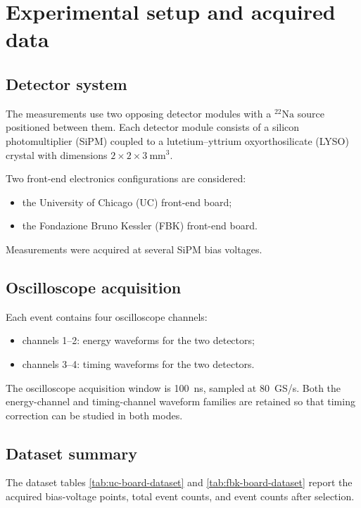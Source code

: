\section{Experimental setup and acquired data}

\subsection{Detector system}

The measurements use two opposing detector modules with a \(^{22}\mathrm{Na}\) source positioned between them. 
Each detector module consists of a silicon photomultiplier (SiPM) coupled to a lutetium--yttrium oxyorthosilicate (LYSO) 
crystal with dimensions \(2\times2\times3~\mathrm{mm}^3\).

Two front-end electronics configurations are considered:
\begin{itemize}[leftmargin=*]
    \item the University of Chicago (UC) front-end board;
    \item the Fondazione Bruno Kessler (FBK) front-end board.
\end{itemize}
Measurements were acquired at several SiPM bias voltages. 

\subsection{Oscilloscope acquisition}

Each event contains four oscilloscope channels:
\begin{itemize}[leftmargin=*]
    \item channels 1--2: energy waveforms for the two detectors;
    \item channels 3--4: timing waveforms for the two detectors.
\end{itemize}

The oscilloscope acquisition window is \SI{100}{ns}, sampled at \SI{80}{GS/s}. Both the energy-channel and timing-channel waveform families 
are retained so that timing correction can be studied in both modes.

\subsection{Dataset summary}

The dataset tables \ref{tab:uc-board-dataset} and \ref{tab:fbk-board-dataset} report the acquired bias-voltage points, total event counts, and event counts after selection.


